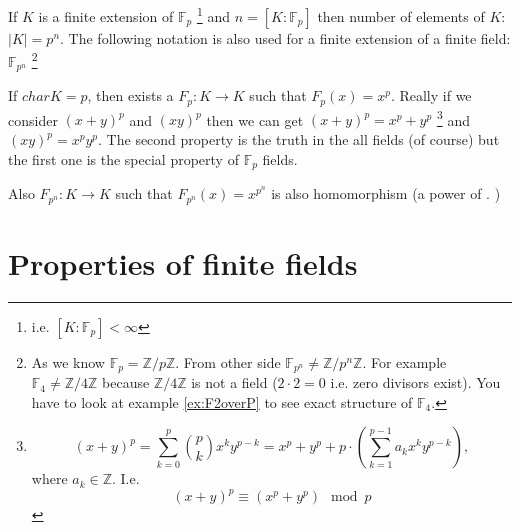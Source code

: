 \begin{remark}[$\mathbb{F}_{p^n}$]
  If $K$ is a finite extension of $\mathbb{F}_p$
  \footnote{
    i.e. $\left[K:\mathbb{F}_p\right] < \infty$
  }
  and
  $n = \left[K:\mathbb{F}_p\right]$ then number of elements of $K$:
  $\left|K\right| = p^n$. The following notation is also used for a
  finite extension of a finite field: $\mathbb{F}_{p^n}$
  \footnote{
    As we know $\mathbb{F}_p = \mathbb{Z}/p \mathbb{Z}$. From other
    side $\mathbb{F}_{p^n} \ne \mathbb{Z}/p^n \mathbb{Z}$.
    For example $\mathbb{F}_4 \ne \mathbb{Z}/4 \mathbb{Z}$ because
    $\mathbb{Z}/4 \mathbb{Z}$ is not a field ($2 \cdot 2 = 0$
    i.e. zero divisors exist). You have to look at example
    \ref{ex:F2overP} to see exact structure of $\mathbb{F}_4$.
  }
  \label{rem:fpn}
\end{remark}

\begin{remark}
  If $char K = p$, then exists a 
  $F_p: K \to K$ such that $F_p\left(x\right) = x^p$.
  Really if we consider $\left(x+y\right)^p$ and $\left(xy\right)^p$
  then we can get $\left(x+y\right)^p = x^p + y^p$
  \footnote{
    \[
    \left(x+y\right)^p = \sum_{k=0}^p {p \choose k} x^k y^{p-k}  =
    x^p + y^p + p \cdot \left( \sum_{k=1}^{p-1} a_k x^k y^{p-k} \right),
    \]
    where $a_k \in \mathbb{Z}$. I.e.
    \[
    \left(x+y\right)^p \equiv    
    \left(x^p + y^p\right)  \mod p
    \]    
  }
  and
  $\left(xy\right)^p = x^p y^p$. The second property is the truth in
  the all fields (of course) but the first one is the special property
  of $\mathbb{F}_p$ fields.
  \label{rem:frobeniushomomorphism}
\end{remark}

\begin{remark}
  Also $F_{p^n} : K \to K$ such that $F_{p^n}\left(x\right) = x^{p^n}$
  is also homomorphism (a power of .
  \label{rem:frobeniuspowerhomomorphism})
\end{remark}

\section{Properties of finite fields}

